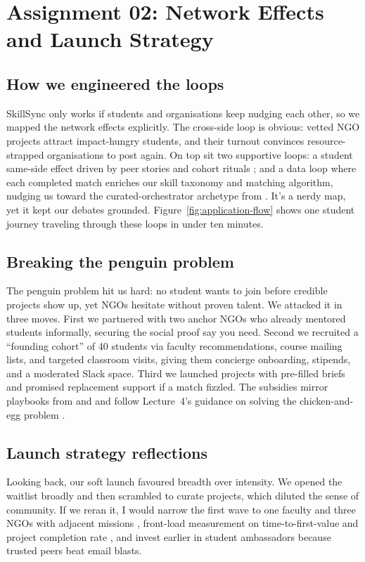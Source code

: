 \section*{Assignment 02: Network Effects and Launch Strategy}

\subsection*{How we engineered the loops}
SkillSync only works if students and organisations keep nudging each other, so we mapped the network effects explicitly. The cross-side loop is obvious: vetted NGO projects attract impact-hungry students, and their turnout convinces resource-strapped organisations to post again. On top sit two supportive loops: a student same-side effect driven by peer stories and cohort rituals \citep{Choudary2016}; and a data loop where each completed match enriches our skill taxonomy and matching algorithm, nudging us toward the curated-orchestrator archetype from \citet{Reillier2017}. It's a nerdy map, yet it kept our debates grounded. Figure~\ref{fig:application-flow} shows one student journey traveling through these loops in under ten minutes.

\subsection*{Breaking the penguin problem}
The penguin problem hit us hard: no student wants to join before credible projects show up, yet NGOs hesitate without proven talent. We attacked it in three moves. First we partnered with two anchor NGOs who already mentored students informally, securing the social proof \citet{HagiuWright2013} say you need. Second we recruited a ``founding cohort'' of 40 students via faculty recommendations, course mailing lists, and targeted classroom visits, giving them concierge onboarding, stipends, and a moderated Slack space. Third we launched projects with pre-filled briefs and promised replacement support if a match fizzled. The subsidies mirror playbooks from \citet{Gunasilan2024} and \citet{FarrellSaloner1986} and follow Lecture~4's guidance on solving the chicken-and-egg problem \citep{Lecture04}.

\subsection*{Launch strategy reflections}
Looking back, our soft launch favoured breadth over intensity. We opened the waitlist broadly and then scrambled to curate projects, which diluted the sense of community. If we reran it, I would narrow the first wave to one faculty and three NGOs with adjacent missions \citep{Choudary2016}, front-load measurement on time-to-first-value and project completion rate \citep{ShapiroVarian1999}, and invest earlier in student ambassadors because trusted peers beat email blasts.

